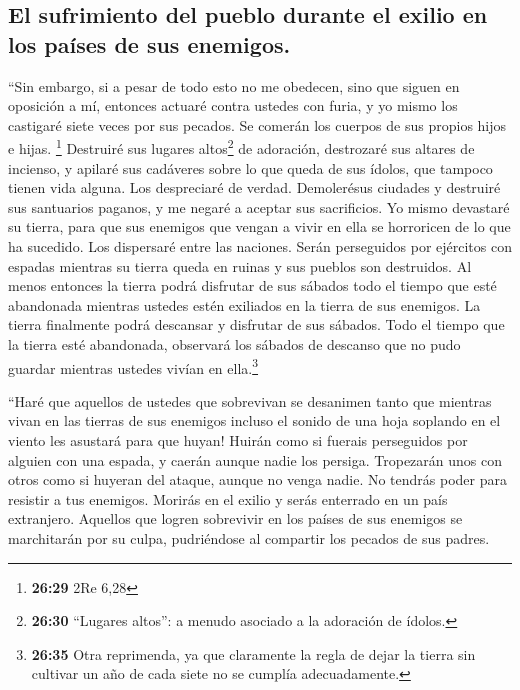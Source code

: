 \hypertarget{el-sufrimiento-del-pueblo-durante-el-exilio-en-los-pauxedses-de-sus-enemigos.}{%
\subsection{El sufrimiento del pueblo durante el exilio en los países de
sus
enemigos.}\label{el-sufrimiento-del-pueblo-durante-el-exilio-en-los-pauxedses-de-sus-enemigos.}}

 ``Sin embargo, si a pesar de todo esto no me obedecen,
sino que siguen en oposición a mí,  entonces actuaré
contra ustedes con furia, y yo mismo los castigaré siete veces por sus
pecados.  Se comerán los cuerpos de sus propios hijos e
hijas. \footnote{\textbf{26:29} 2Re 6,28}  Destruiré sus
lugares altos\footnote{\textbf{26:30} ``Lugares altos'': a menudo
  asociado a la adoración de ídolos.} de adoración, destrozaré sus
altares de incienso, y apilaré sus cadáveres sobre lo que queda de sus
ídolos, que tampoco tienen vida alguna. Los despreciaré de verdad.
 Demolerésus ciudades y destruiré sus santuarios paganos,
y me negaré a aceptar sus sacrificios.  Yo mismo
devastaré su tierra, para que sus enemigos que vengan a vivir en ella se
horroricen de lo que ha sucedido.  Los dispersaré entre
las naciones. Serán perseguidos por ejércitos con espadas mientras su
tierra queda en ruinas y sus pueblos son destruidos.  Al
menos entonces la tierra podrá disfrutar de sus sábados todo el tiempo
que esté abandonada mientras ustedes estén exiliados en la tierra de sus
enemigos. La tierra finalmente podrá descansar y disfrutar de sus
sábados.  Todo el tiempo que la tierra esté abandonada,
observará los sábados de descanso que no pudo guardar mientras ustedes
vivían en ella.\footnote{\textbf{26:35} Otra reprimenda, ya que
  claramente la regla de dejar la tierra sin cultivar un año de cada
  siete no se cumplía adecuadamente.}

 ``Haré que aquellos de ustedes que sobrevivan se
desanimen tanto que mientras vivan en las tierras de sus enemigos
incluso el sonido de una hoja soplando en el viento les asustará para
que huyan! Huirán como si fuerais perseguidos por alguien con una
espada, y caerán aunque nadie los persiga.  Tropezarán
unos con otros como si huyeran del ataque, aunque no venga nadie. No
tendrás poder para resistir a tus enemigos.  Morirás en
el exilio y serás enterrado en un país extranjero. 
Aquellos que logren sobrevivir en los países de sus enemigos se
marchitarán por su culpa, pudriéndose al compartir los pecados de sus
padres.

